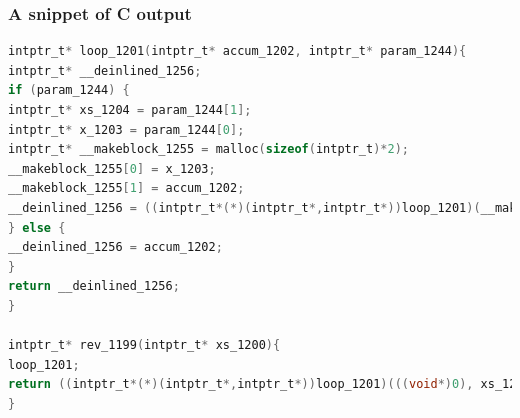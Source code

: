\documentclass[xcolor={usenames,dvipsnames,svgnames,table}]{beamer}
\begin{document}
\begin{frame}[fragile]
  \frametitle{A snippet of C output}

  \begin{lstlisting}[language=C,basicstyle=\ttfamily\scriptsize,morekeywords={intptr_t}]
intptr_t* loop_1201(intptr_t* accum_1202, intptr_t* param_1244){
intptr_t* __deinlined_1256;
if (param_1244) {
intptr_t* xs_1204 = param_1244[1];
intptr_t* x_1203 = param_1244[0];
intptr_t* __makeblock_1255 = malloc(sizeof(intptr_t)*2);
__makeblock_1255[0] = x_1203;
__makeblock_1255[1] = accum_1202;
__deinlined_1256 = ((intptr_t*(*)(intptr_t*,intptr_t*))loop_1201)(__makeblock_1255, xs_1204);
} else {
__deinlined_1256 = accum_1202;
}
return __deinlined_1256;
}

intptr_t* rev_1199(intptr_t* xs_1200){
loop_1201;
return ((intptr_t*(*)(intptr_t*,intptr_t*))loop_1201)(((void*)0), xs_1200);
}

\end{lstlisting}

\end{frame}
\end{document}
